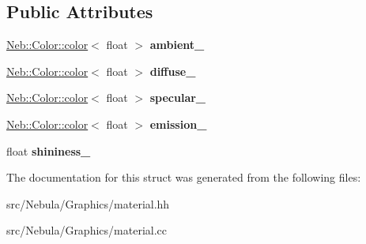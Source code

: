 \subsection*{\-Public \-Attributes}
\begin{DoxyCompactItemize}
\item 
\hypertarget{structNeb_1_1material_1_1raw_ac89b7d0fbb78c1b32cce884ccc02ee7c}{\hyperlink{classNeb_1_1Color_1_1color}{\-Neb\-::\-Color\-::color}$<$ float $>$ {\bfseries ambient\-\_\-}}\label{structNeb_1_1material_1_1raw_ac89b7d0fbb78c1b32cce884ccc02ee7c}

\item 
\hypertarget{structNeb_1_1material_1_1raw_a89affeb24a5f68aed606b9a10a9200da}{\hyperlink{classNeb_1_1Color_1_1color}{\-Neb\-::\-Color\-::color}$<$ float $>$ {\bfseries diffuse\-\_\-}}\label{structNeb_1_1material_1_1raw_a89affeb24a5f68aed606b9a10a9200da}

\item 
\hypertarget{structNeb_1_1material_1_1raw_a5c95594cfb7b0d09b7e9451f44b73148}{\hyperlink{classNeb_1_1Color_1_1color}{\-Neb\-::\-Color\-::color}$<$ float $>$ {\bfseries specular\-\_\-}}\label{structNeb_1_1material_1_1raw_a5c95594cfb7b0d09b7e9451f44b73148}

\item 
\hypertarget{structNeb_1_1material_1_1raw_a5b5e60a7d67b5eca9f553ba3d017f1e7}{\hyperlink{classNeb_1_1Color_1_1color}{\-Neb\-::\-Color\-::color}$<$ float $>$ {\bfseries emission\-\_\-}}\label{structNeb_1_1material_1_1raw_a5b5e60a7d67b5eca9f553ba3d017f1e7}

\item 
\hypertarget{structNeb_1_1material_1_1raw_ada9810b67306db0c24bdfcc0b08d500a}{float {\bfseries shininess\-\_\-}}\label{structNeb_1_1material_1_1raw_ada9810b67306db0c24bdfcc0b08d500a}

\end{DoxyCompactItemize}


\-The documentation for this struct was generated from the following files\-:\begin{DoxyCompactItemize}
\item 
src/\-Nebula/\-Graphics/material.\-hh\item 
src/\-Nebula/\-Graphics/material.\-cc\end{DoxyCompactItemize}
